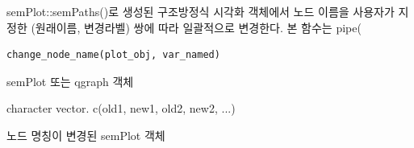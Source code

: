 \documentclass[a4paper]{book}
\begin{document}
%
\begin{Description}
semPlot::semPaths()로 생성된 구조방정식 시각화 객체에서
노드 이름을 사용자가 지정한 (원래이름, 변경라벨) 쌍에 따라
일괄적으로 변경한다.
본 함수는 pipe(
\end{Description}
%
\begin{Usage}
\begin{verbatim}
change_node_name(plot_obj, var_named)
\end{verbatim}
\end{Usage}
%
\begin{Arguments}
\begin{ldescription}
\item[\code{plot\_obj}] semPlot 또는 qgraph 객체

\item[\code{var\_named}] character vector.
c(old1, new1, old2, new2, ...)
\end{ldescription}
\end{Arguments}
%
\begin{Value}
노드 명칭이 변경된 semPlot 객체
\end{Value}
%
\end{document}
